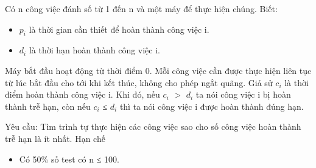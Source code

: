 Có n công việc đánh số từ 1 đến n và một máy để thực hiện chúng. Biết:  
\begin{itemize}
	\item     $p_{i}$    là thời gian cần thiết để hoàn thành công việc i.   
	\item     $d_{i}$    là thời hạn hoàn thành công việc i.   
\end{itemize}

   Máy bắt đầu hoạt động từ thời điểm 0. Mỗi công việc cần được thực hiện liên tục từ lúc bắt đầu cho tới khi kết thúc, không cho phép ngắt quãng. Giả sử $c_{i}$   là thời điểm hoàn thành công việc i. Khi đó, nếu $c_{i}$   $>$  $d_{i}$   ta nói công việc i bị hoàn thành trễ hạn, còn nếu  $c_{i}$   ≤ $d_{i}$   thì ta nói công việc i được hoàn thành đúng hạn.  

   Yêu cầu: Tìm trình tự thực hiện các công việc sao cho số công việc hoàn thành trễ hạn là ít nhất.
Hạn chế
\begin{itemize}
	\item     Có 50\% số test có n ≤ 100.   
\end{itemize}